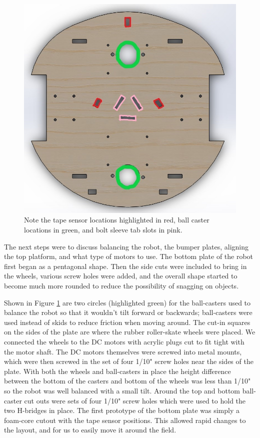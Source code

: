 \documentclass[]{article}
\begin{document}
\begin{figure}[H]
    \centering
    \includegraphics[scale=0.45]{bottom-plate-highlight-CAD.jpg}
    \caption{Note the tape sensor locations highlighted in red, ball caster locations in green, and bolt sleeve tab slots in pink.}
    \label{bottom plate highlight}
\end{figure}


The next steps were to discuss balancing the robot, the bumper plates, aligning the top platform, and what type of motors to use. The bottom plate of the robot first began as a pentagonal shape. Then the side cuts were included to bring in the wheels, various screw holes were added, and the overall shape started to become much more rounded to reduce the possibility of snagging on objects.

Shown in Figure \ref{bottom plate highlight} are two circles (highlighted green) for the ball-casters used to balance the robot so that it wouldn't tilt forward or backwards; ball-casters were used instead of skids to reduce friction when moving around. The cut-in squares on the sides of the plate are where the rubber roller-skate wheels were placed. We connected the wheels to the DC motors with acrylic plugs cut to fit tight with the motor shaft. The DC motors themselves were screwed into metal mounts, which were then screwed in the set of four 1/10" screw holes near the sides of the plate. With both the wheels and ball-casters in place the height difference between the bottom of the casters and bottom of the wheels was less than 1/10" so the robot was well balanced with a small tilt. Around the top and bottom ball-caster cut outs were sets of four 1/10" screw holes which were used to hold the two H-bridges in place. The first prototype of the bottom plate was simply a foam-core cutout with the tape sensor positions. This allowed rapid changes to the layout, and for us to easily move it around the field. 
\end{document}
